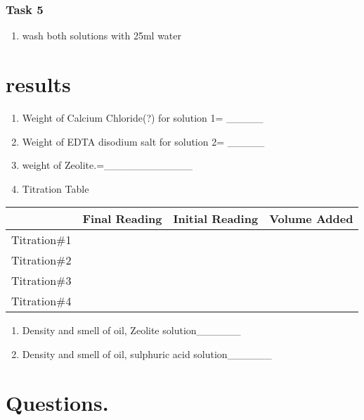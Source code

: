 \documentclass[]{article}
\providecommand{\tightlist}{%
  \setlength{\itemsep}{0pt}\setlength{\parskip}{0pt}}
\begin{document}
\hypertarget{task-5}{%
\subsubsection{Task 5}\label{task-5}}

\begin{enumerate}
\def\labelenumi{\arabic{enumi}.}
\tightlist
\item
  wash both solutions with 25ml water
\end{enumerate}

\hypertarget{results}{%
\section{results}\label{results}}

\begin{enumerate}
\def\labelenumi{\arabic{enumi}.}
\item
  Weight of Calcium Chloride(?) for solution 1= \_\_\_\_\_
\item
  Weight of EDTA disodium salt for solution 2= \_\_\_\_\_
\item
  weight of Zeolite.=\_\_\_\_\_\_\_\_\_\_\_\_
\item
  Titration Table
\end{enumerate}

\begin{longtable}[]{@{}llll@{}}
\toprule
& Final Reading & Initial Reading & Volume Added\tabularnewline
\midrule
\endhead
Titration\#1 & & &\tabularnewline
Titration\#2 & & &\tabularnewline
Titration\#3 & & &\tabularnewline
Titration\#4 & & &\tabularnewline
\bottomrule
\end{longtable}

\begin{enumerate}
\def\labelenumi{\arabic{enumi}.}
\setcounter{enumi}{4}
\tightlist
\item
  Density and smell of oil, Zeolite solution\_\_\_\_\_\_
\item
  Density and smell of oil, sulphuric acid solution\_\_\_\_\_\_
\end{enumerate}

\hypertarget{questions.}{%
\section{Questions.}\label{questions.}}
\end{document}
